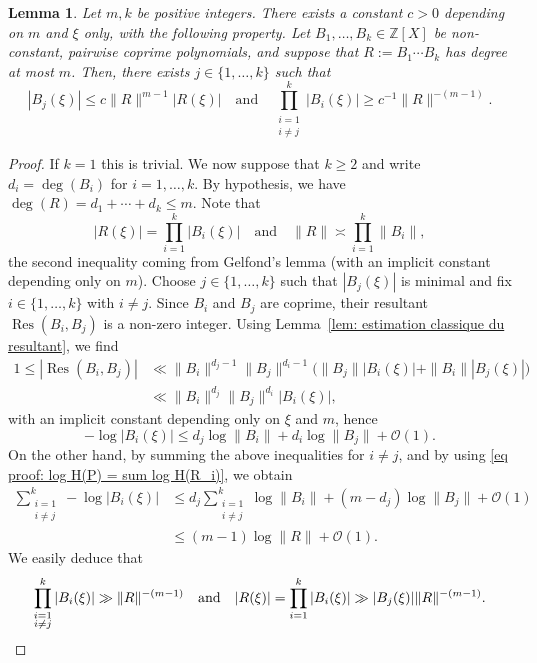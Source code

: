 \documentclass[10pt,a4paper]{amsart}
\numberwithin{equation}{section}
\DeclareMathOperator\Res{Res}
\newcommand\bZ{\mathbb{Z}}
\newcommand\GrO{\mathcal{O}}
\newcommand{\normH}[1]{\|#1\|}
\newcommand\AND{\quad\text{and}\quad}
\theoremstyle{definition}
\theoremstyle{plain}
\newtheorem{Lem}[Def]{Lemma}
\begin{document}
\begin{Lem}
\label{lem: lem general 2}
Let $m,k$ be positive integers. There exists a constant $c>0$ depending on $m$ and $\xi$ only, with the following property. Let $B_1,\dots,B_k\in\bZ[X]$ be non-constant, pairwise coprime polynomials, and suppose that $R:= B_1\cdots B_k$ has degree at most $m$. Then, there exists $j\in\{1,\dots,k\}$ such that
\[
|B_j(\xi)| \leq c\normH{R}^{m-1}|R(\xi)| \AND \prod_{\substack{i=1 \\ i\neq j}}^{k} |B_i(\xi)| \geq c^{-1}\normH{R}^{-(m-1)}.
\]
\end{Lem}

\begin{proof}
If $k=1$ this is trivial. We now suppose that $k\geq 2$ and write $d_i = \deg(B_i)$ for $i=1,\dots, k$. By hypothesis, we have $\deg(R) = d_1+\cdots + d_k \leq m$. Note that
\begin{equation}
\label{eq proof: log H(P) = sum log H(R_i)}
|R(\xi)| = \prod_{i=1}^{k} |B_i(\xi)| \AND \normH{R} \asymp \prod_{i=1}^{k} \normH{B_i},
\end{equation}
the second inequality coming from Gelfond's lemma (with an implicit constant depending only on $m$). Choose $j\in\{1,\dots,k\}$ such that $|B_j(\xi)|$ is minimal and fix $i\in\{1,\dots,k\}$ with $i\neq j$. Since $B_i$ and $B_j$ are coprime, their resultant $\Res(B_i,B_j)$ is a non-zero integer. Using Lemma~\ref{lem: estimation classique du resultant}, we find
\begin{align*}
1 \leq |\Res(B_i,B_j)| & \ll \normH{B_i}^{d_j-1} \normH{B_j}^{d_i-1}\big( \normH{B_j}|B_i(\xi)| + \normH{B_i}|B_j(\xi)|\big) \\
& \ll \normH{B_i}^{d_j} \normH{B_j}^{d_i}|B_i(\xi)|,
\end{align*}
with an implicit constant depending only on $\xi$ and $m$, hence
\[
-\log |B_i(\xi)| \leq d_j\log \normH{B_i} + d_i\log \normH{B_j} + \GrO(1).
\]
On the other hand, by summing the above inequalities for $i\neq j$, and by using \eqref{eq proof: log H(P) = sum log H(R_i)}, we obtain
\begin{align*}
\sum_{\substack{i=1 \\ i\neq j}}^{k} -\log |B_i(\xi)|
& \leq d_j\sum_{\substack{i=1 \\ i\neq j}}^{k} \log \normH{B_i} +(m-d_j) \log \normH{B_j} + \GrO(1) \\
& \leq (m-1)\log \normH{R} + \GrO(1).
\end{align*}
We easily deduce that
\[
\prod_{\substack{i=1 \\ i\neq j}}^{k} |B_i(\xi)| \gg \normH{R}^{-(m-1)} \AND
|R(\xi)| = \prod_{i=1}^{k}|B_i(\xi)| \gg |B_j(\xi)| \normH{R}^{- (m-1)}.\qedhere
\]
\end{proof}
\end{document}
